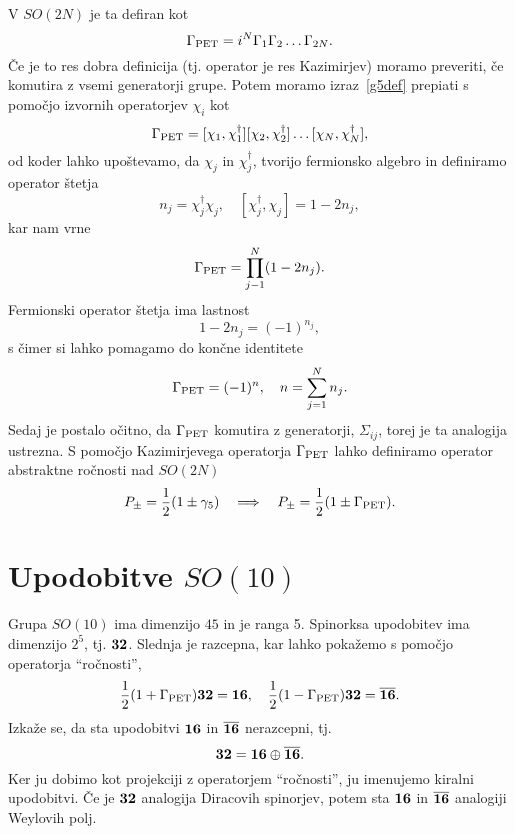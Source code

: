 V $SO(2N)$ je ta defiran kot~\cite{mohapatra}
\begin{equation}
	\Gamma_{\text{PET}} = i^N \Gamma_1 \Gamma_2 \ldots \Gamma_{2N}.
	\label{g5def}
\end{equation}
Če je to res dobra definicija (tj. operator je res Kazimirjev) moramo preveriti, če komutira z
vsemi generatorji grupe. Potem moramo izraz~\eqref{g5def} prepiati s pomočjo izvornih operatorjev
$\chi_i$ kot
\begin{equation}
	\Gamma_{\text{PET}} = [\chi_1,\chi^\dagger_1][\chi_2,\chi_2^\dagger]\ldots[\chi_N,\chi_N^\dagger],
\end{equation}
od koder lahko upoštevamo, da $\chi_j$ in $\chi_j^\dagger$, tvorijo fermionsko algebro in definiramo
operator štetja
\begin{equation}
	n_j = \chi_j^\dagger \chi_j, \quad [\chi^\dagger_j,\chi_j] = 1 - 2n_j,
\end{equation}
kar nam vrne
\begin{equation}
	\Gamma_{\text{PET}} = \prod_{j - 1}^N(1 - 2n_j).
\end{equation}
Fermionski operator štetja ima lastnost
\[
	1 - 2n_j = (-1)^{n_j},
\]
s čimer si lahko pomagamo do končne identitete~\cite{mohapatra}
\begin{equation}
	\Gamma_{\text{PET}} = (-1)^n, \quad n = \sum_{j = 1}^N n_j.
\end{equation}
Sedaj je postalo očitno, da $\Gamma_{\text{PET}}$ komutira z generatorji, $\Sigma_{ij}$, torej je ta analogija
ustrezna. S pomočjo Kazimirjevega operatorja $\Gamma_{\text{PET}}$ lahko definiramo operator abstraktne
ročnosti nad $SO(2N)$
\begin{equation}
	P_{\pm} = \frac{1}{2}(1 \pm \gamma_5)\quad\Longrightarrow\quad P_{\pm} = \frac{1}{2}(1 \pm \Gamma_{\text{PET}}).
\end{equation}

\section{Upodobitve $SO(10)$}

Grupa $SO(10)$ ima dimenzijo $45$ in je ranga 5. Spinorksa upodobitev ima dimenzijo $2^5$, tj.
$\mathbf{32}$. Slednja je razcepna, kar lahko pokažemo s pomočjo operatorja "`ročnosti"',
\begin{equation}
	\frac{1}{2}(1 + \Gamma_{\text{PET}})\mathbf{32} = \mathbf{16}, \quad \frac{1}{2}(1 - \Gamma_{\text{PET}})\mathbf{32} = \overline{\mathbf{16}}.
\end{equation}
Izkaže se, da sta upodobitvi $\mathbf{16}$ in $\overline{\mathbf{16}}$ nerazcepni, tj.
\begin{equation}
	\mathbf{32} = \mathbf{16}\oplus\overline{\mathbf{16}}.
\end{equation}
Ker ju dobimo kot projekciji z operatorjem "`ročnosti"', ju imenujemo kiralni upodobitvi. Če je $\mathbf{32}$
analogija Diracovih spinorjev, potem sta $\mathbf{16}$ in $\overline{\mathbf{16}}$ analogiji Weylovih polj.

